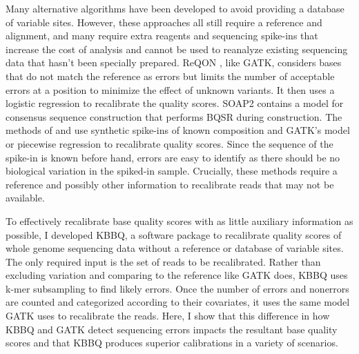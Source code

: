 Many alternative algorithms have been developed to avoid providing a database of variable sites. However, these approaches all still require a reference and alignment, and many require extra reagents and sequencing spike-ins that increase the cost of analysis and cannot be used to reanalyze existing sequencing data that hasn't been specially prepared.
ReQON \parencite{cabanski_reqon:_2012}, like GATK, considers bases that do not match the reference as errors but limits the number of acceptable errors at a position to minimize the effect of unknown variants. It then uses a logistic regression to recalibrate the quality scores.
SOAP2 \parencite{li_soap2:_2009} contains a model for consensus sequence construction that performs BQSR during construction. %
The methods of \cite{zook_synthetic_2012} and \cite{ni_improvement_2016} use synthetic spike-ins of known composition and GATK's model \parencite{zook_synthetic_2012} or piecewise regression \parencite{ni_improvement_2016} to recalibrate quality scores. Since the sequence of the spike-in is known before hand, errors are easy to identify as there should be no biological variation in the spiked-in sample.
Crucially, these methods require a reference and possibly other information to recalibrate reads that may not be available.

To effectively recalibrate base quality scores with as little auxiliary information as possible, I developed KBBQ, a software package to recalibrate quality scores of whole genome sequencing data without a reference or database of variable sites. The only required input is the set of reads to be recalibrated. Rather than excluding variation and comparing to the reference like GATK does, KBBQ uses k-mer subsampling to find likely errors. Once the number of errors and nonerrors are counted and categorized according to their covariates, it uses the same model GATK uses to recalibrate the reads. Here, I show that this difference in how KBBQ and GATK detect sequencing errors impacts the resultant base quality scores and that KBBQ produces superior calibrations in a variety of scenarios.

